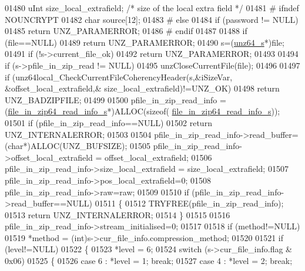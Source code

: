 \begin{DoxyCode}
01480     uInt  size\_local\_extrafield;    \textcolor{comment}{/* size of the local extra field */}
01481 \textcolor{preprocessor}{#    ifndef NOUNCRYPT}
01482     \textcolor{keywordtype}{char} source[12];
01483 \textcolor{preprocessor}{#    else}
01484     \textcolor{keywordflow}{if} (password != NULL)
01485         \textcolor{keywordflow}{return} UNZ\_PARAMERROR;
01486 \textcolor{preprocessor}{#    endif}
01487 
01488     \textcolor{keywordflow}{if} (file==NULL)
01489         \textcolor{keywordflow}{return} UNZ\_PARAMERROR;
01490     s=(\hyperlink{structunz64__s}{unz64\_s}*)file;
01491     \textcolor{keywordflow}{if} (!s->current\_file\_ok)
01492         \textcolor{keywordflow}{return} UNZ\_PARAMERROR;
01493 
01494     \textcolor{keywordflow}{if} (s->pfile\_in\_zip\_read != NULL)
01495         unzCloseCurrentFile(file);
01496 
01497     \textcolor{keywordflow}{if} (unz64local\_CheckCurrentFileCoherencyHeader(s,&iSizeVar, &offset\_local\_extrafield,&
      size\_local\_extrafield)!=UNZ\_OK)
01498         \textcolor{keywordflow}{return} UNZ\_BADZIPFILE;
01499 
01500     pfile\_in\_zip\_read\_info = (\hyperlink{structfile__in__zip64__read__info__s}{file\_in\_zip64\_read\_info\_s}*)ALLOC(\textcolor{keyword}{sizeof}(
      \hyperlink{structfile__in__zip64__read__info__s}{file\_in\_zip64\_read\_info\_s}));
01501     \textcolor{keywordflow}{if} (pfile\_in\_zip\_read\_info==NULL)
01502         \textcolor{keywordflow}{return} UNZ\_INTERNALERROR;
01503 
01504     pfile\_in\_zip\_read\_info->read\_buffer=(\textcolor{keywordtype}{char}*)ALLOC(UNZ\_BUFSIZE);
01505     pfile\_in\_zip\_read\_info->offset\_local\_extrafield = offset\_local\_extrafield;
01506     pfile\_in\_zip\_read\_info->size\_local\_extrafield = size\_local\_extrafield;
01507     pfile\_in\_zip\_read\_info->pos\_local\_extrafield=0;
01508     pfile\_in\_zip\_read\_info->raw=raw;
01509 
01510     \textcolor{keywordflow}{if} (pfile\_in\_zip\_read\_info->read\_buffer==NULL)
01511     \{
01512         TRYFREE(pfile\_in\_zip\_read\_info);
01513         \textcolor{keywordflow}{return} UNZ\_INTERNALERROR;
01514     \}
01515 
01516     pfile\_in\_zip\_read\_info->stream\_initialised=0;
01517 
01518     \textcolor{keywordflow}{if} (method!=NULL)
01519         *method = (int)s->cur\_file\_info.compression\_method;
01520 
01521     if (level!=NULL)
01522     \{
01523         *level = 6;
01524         \textcolor{keywordflow}{switch} (s->cur\_file\_info.flag & 0x06)
01525         \{
01526           \textcolor{keywordflow}{case} 6 : *level = 1; \textcolor{keywordflow}{break};
01527           \textcolor{keywordflow}{case} 4 : *level = 2; \textcolor{keywordflow}{break};

\end{DoxyCode}
